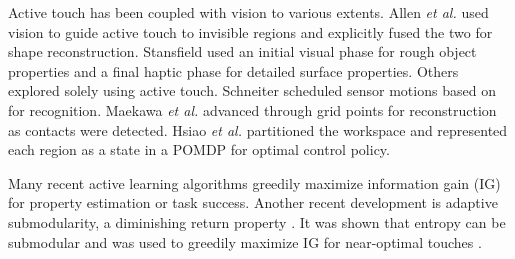 \documentclass[letterpaper, 10 pt, conference]{ieeeconf}  %
\begin{document}
Active touch has been coupled with vision to various extents.
Allen \textit{et al.} \cite{allen1985, allen1988} used vision to guide active touch to invisible regions and explicitly fused the two for shape reconstruction.
Stansfield \cite{stansfield1988} used an initial visual phase for rough object properties and a final haptic phase for detailed surface properties.
Others explored solely using active touch.
Schneiter \cite{schneiter1986} scheduled sensor motions based on \cite{grimson1984} for recognition.
Maekawa \textit{et al.} \cite{maekawa1992} advanced through grid points for reconstruction as contacts were detected.
Hsiao \textit{et al.} \cite{hsiao2007} partitioned the workspace and represented each region as a state in a POMDP for optimal control policy.

Many recent active learning algorithms greedily maximize information gain (IG) \cite{schneider2009, hsiao2010, saal2010, hebert2013, doumanoglou2016} for %
property estimation or task success.
%
Another recent development is adaptive submodularity, a diminishing return property \cite{golovin2010, golovin2011}.
It was shown that entropy can be submodular and was used to greedily maximize IG for near-optimal touches \cite{javdani2013}.
\end{document}

